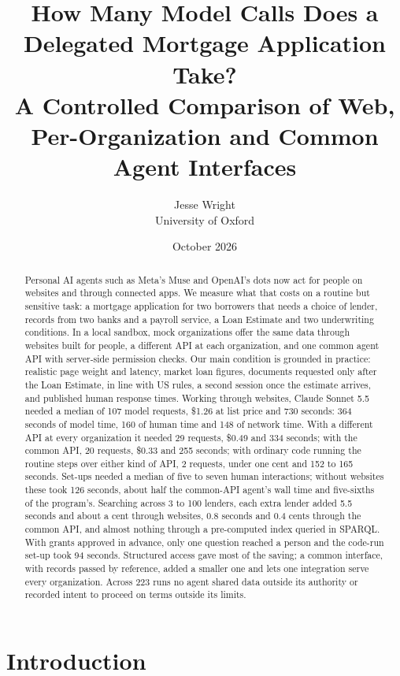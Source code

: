 \documentclass[11pt]{article}
\title{How Many Model Calls Does a Delegated Mortgage Application Take?\\[2pt]
\large A Controlled Comparison of Web, Per-Organization and Common Agent Interfaces}
\author{Jesse Wright\\University of Oxford}
\date{October 2026}
\begin{document}
\maketitle

\begin{abstract}
Personal AI agents such as Meta's Muse and OpenAI's dots now act for people on websites and through connected apps. We measure what that costs on a routine but sensitive task: a mortgage application for two borrowers that needs a choice of lender, records from two banks and a payroll service, a Loan Estimate and two underwriting conditions. In a local sandbox, mock organizations offer the same data through websites built for people, a different API at each organization, and one common agent API with server-side permission checks. Our main condition is grounded in practice: realistic page weight and latency, market loan figures, documents requested only after the Loan Estimate, in line with US rules, a second session once the estimate arrives, and published human response times. Working through websites, Claude Sonnet 5.5 needed a median of 107 model requests, \$1.26 at list price and 730 seconds: 364 seconds of model time, 160 of human time and 148 of network time. With a different API at every organization it needed 29 requests, \$0.49 and 334 seconds; with the common API, 20 requests, \$0.33 and 255 seconds; with ordinary code running the routine steps over either kind of API, 2 requests, under one cent and 152 to 165 seconds. Set-ups needed a median of five to seven human interactions; without websites these took 126 seconds, about half the common-API agent's wall time and five-sixths of the program's. Searching across 3 to 100 lenders, each extra lender added 5.5 seconds and about a cent through websites, 0.8 seconds and 0.4 cents through the common API, and almost nothing through a pre-computed index queried in SPARQL. With grants approved in advance, only one question reached a person and the code-run set-up took 94 seconds. Structured access gave most of the saving; a common interface, with records passed by reference, added a smaller one and lets one integration serve every organization. Across 223 runs no agent shared data outside its authority or recorded intent to proceed on terms outside its limits.
\end{abstract}

\section{Introduction}
\end{document}
